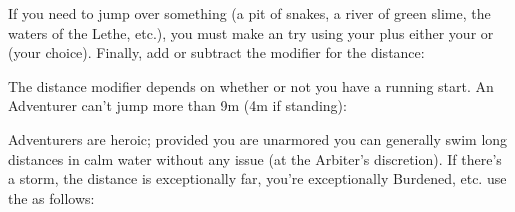 

  If you need to jump over something (a pit of snakes, a river of green slime, the waters of the Lethe, etc.), you must make an \RO try using your \MD plus either your \VIG or \DEX (your choice). Finally, add or subtract the modifier for the distance:


  The distance modifier depends on whether or not you have a running start. An Adventurer can't jump more than 9m (4m if standing):



\cbreak


Adventurers are heroic; provided you are unarmored you can generally swim long distances in calm water without any issue (at the Arbiter's discretion). If there's a storm, the distance is exceptionally far, you're exceptionally Burdened, etc. use the \MD as follows:



